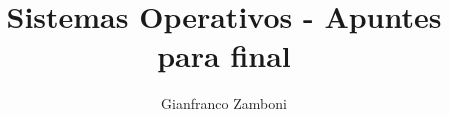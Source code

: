 


\title{Sistemas Operativos - Apuntes para final}
\author{Gianfranco Zamboni}

\usepackage[backend=biber,style=chem-acs,sorting=none]{biblatex}
\nocite{*}





	\maketitle
	\tableofcontents

\newpage


\newpage


\newpage


\newpage


\newpage


\newpage


\newpage


\newpage

	


